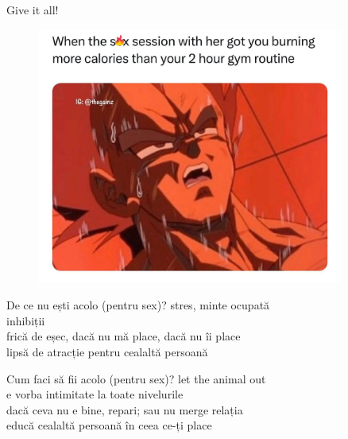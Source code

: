 \documentclass{simple}
\begin{document}
\begin{frame}{Give it all!}
  \pause
  \begin{figure}
    \centering
    \includegraphics[width=0.9\textwidth]{img/sex-session-vegeta.jpg}
  \end{figure}
\end{frame}

\begin{frame}{De ce nu ești acolo (pentru sex)?}
  \centering
  \Large
  \pause
  stres, minte ocupată \\
  \vspace{1cm}
  \pause
  inhibiții \\
  \vspace{1cm}
  \pause
  frică de eșec, dacă nu mă place, dacă nu îi place \\
  \vspace{1cm}
  \pause
  lipsă de atracție pentru cealaltă persoană
\end{frame}

\begin{frame}{Cum faci să fii acolo (pentru sex)?}
  \centering
  \Large
  \pause
  let the animal out \\
  \vspace{1cm}
  \pause
  e vorba intimitate la toate nivelurile \\
  \vspace{1cm}
  \pause
  dacă ceva nu e bine, repari; sau nu merge relația \\
  \vspace{1cm}
  \pause
  educă cealaltă persoană în ceea ce-ți place
\end{frame}
\end{document}

